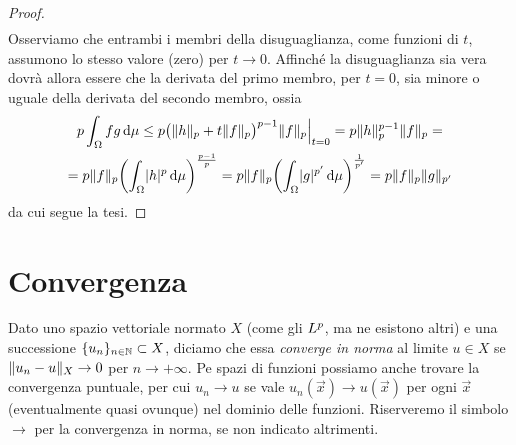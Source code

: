 \begin{proof}
\begin{multline}
    \end{multline}
    Osserviamo che entrambi i membri della disuguaglianza, come funzioni di $t$, assumono lo stesso valore (zero) per $t\to 0$.
    Affinch\'e la disuguaglianza sia vera dovrà allora essere che la derivata del primo membro, per $t=0$, sia minore o uguale della derivata del secondo membro, ossia
    \begin{multline}
        p\int_\Omega fg\,\dd\mu\le
        p\bigl(\norm{h}_p+t\norm{f}_p\bigr)^{p-1}\norm{f}_p\Big\rvert_{t=0}=
        p\norm{h}_p^{p-1}\norm{f}_p=\\=
        p\norm{f}_p\biggl(\int_\Omega \abs{h}^p\,\dd\mu\biggr)^{\frac{p-1}{p}}=
        p\norm{f}_p\biggl(\int_\Omega \abs{g}^{p'}\,\dd\mu\biggr)^{\frac1{p'}}=p\norm{f}_p\norm{g}_{p'}
    \end{multline}
    da cui segue la tesi.
\end{proof}

\section{Convergenza}
Dato uno spazio vettoriale normato $X$ (come gli $\lclass[p]$, ma ne esistono altri) e una successione $\{u_n\}_{n\in\N}\subset X$, diciamo che essa \emph{converge in norma} al limite $u\in X$ se $\norm{u_n-u}_X\to 0$ per $n\to +\infty$.
Pe spazi di funzioni possiamo anche trovare la convergenza puntuale, per cui $u_n\to u$ se vale $u_n(\vec x)\to u(\vec x)$ per ogni $\vec x$ (eventualmente quasi ovunque) nel dominio delle funzioni.
Riserveremo il simbolo $\to$ per la convergenza in norma, se non indicato altrimenti.

